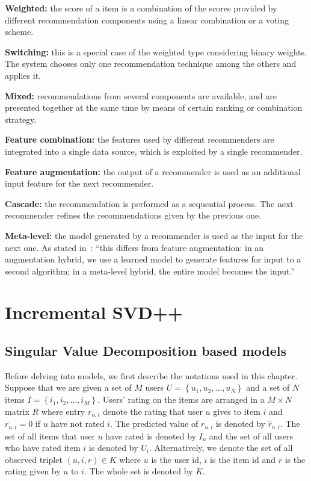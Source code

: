 \documentclass[oneside,13pt]{extreport}
\begin{document}
\begin{description}
    \item{\textbf{Weighted:}}  the score of a item is a combination of the scores provided by different recommendation components  using a linear combination or a voting scheme. 
    \item{\textbf{Switching:}} this is a special case of the weighted type considering binary weights. The system chooses only one recommendation technique among the others and applies it. 
    \item{\textbf{Mixed:}} recommendations from several components are available, and are presented together at the same time by means of certain ranking or combination strategy.
    \item{\textbf{Feature combination:}} the features used by different recommenders are integrated into a single data source, which is exploited by a single recommender.
    \item{\textbf{Feature augmentation:}} the output of a recommender is used as an additional input feature for the next recommender.
    \item{\textbf{Cascade:}} the recommendation is performed as a sequential process. The next recommender refines the recommendations given by the previous one. 
    \item{\textbf{Meta-level:}} the model generated by a recommender is used as the input for the next one. As stated in~\cite{burke2002hybrid}: “this differs from feature augmentation: in an augmentation hybrid, we use a learned model to generate features for input to a second algorithm; in a meta-level hybrid, the entire model becomes the input.”
\end{description}

\chapter{Incremental SVD++}
\label{ISVD++_chapter}

\section{Singular Value Decomposition based models}
Before delving into models, we first describe the notations used in this chapter. Suppose that we are given
a set of $M$ users $U = \left\{ {{u_1},{u_2},...,{u_N}} \right\}$ and a set of $N$ items $I = \left\{ {{i_1},{i_2},...,{i_M}} \right\}$. Users’ rating on the items are arranged in a $M \times N$ matrix $R$ where entry $r_{u,i}$ denote the rating that user $u$ gives to item $i$ and $r_{u,i} = 0$ if $u$ have not rated $i$. The predicted value of $r_{u,i}$ is denoted by $\hat r_{u,i}$. The set of all items that user $u$
have rated is denoted by $I_u$ and the set of all users who have rated item $i$ is denoted by $U_i$. Alternatively, we denote the set of all observed
triplet $\left( {u,i,r} \right) \in K$  where $u$ is the user id, $i$ is the item id
and $r$ is the rating given by $u$ to $i$. The whole set is denoted by $K$. 
\end{document}
